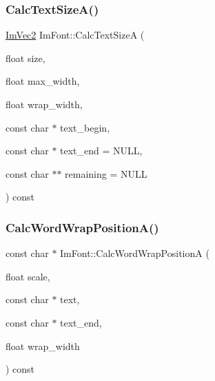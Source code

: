 \mbox{\label{struct_im_font_ad67f64fd206ad197f4b93b1a1ae27cfe}} 
\subsubsection{\texorpdfstring{Calc\+Text\+Size\+A()}{CalcTextSizeA()}}
{\footnotesize\ttfamily \mbox{\hyperlink{struct_im_vec2}{Im\+Vec2}} Im\+Font\+::\+Calc\+Text\+SizeA (\begin{DoxyParamCaption}\item[{float}]{size,  }\item[{float}]{max\+\_\+width,  }\item[{float}]{wrap\+\_\+width,  }\item[{const char $\ast$}]{text\+\_\+begin,  }\item[{const char $\ast$}]{text\+\_\+end = {\ttfamily NULL},  }\item[{const char $\ast$$\ast$}]{remaining = {\ttfamily NULL} }\end{DoxyParamCaption}) const}

\mbox{\label{struct_im_font_a3781bb82a1ceba919cb6c98a398c7a67}} 
\subsubsection{\texorpdfstring{Calc\+Word\+Wrap\+Position\+A()}{CalcWordWrapPositionA()}}
{\footnotesize\ttfamily const char $\ast$ Im\+Font\+::\+Calc\+Word\+Wrap\+PositionA (\begin{DoxyParamCaption}\item[{float}]{scale,  }\item[{const char $\ast$}]{text,  }\item[{const char $\ast$}]{text\+\_\+end,  }\item[{float}]{wrap\+\_\+width }\end{DoxyParamCaption}) const}

\mbox{\label{struct_im_font_aecf7773b1c40b433f91ee245f463de12}} 
